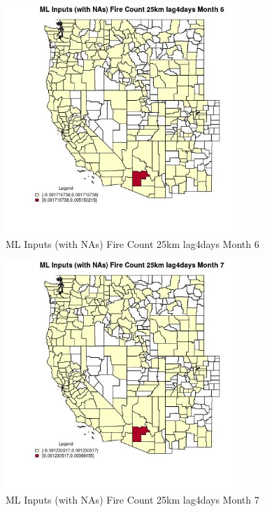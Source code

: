 \begin{figure} 
\centering  
\includegraphics[width=0.77\textwidth]{Code_Outputs/Report_ML_input_PM25_Step4_part_e_de_duplicated_aves_compiled_2019-05-21wNAs_CountyFire_Count_25km_lag4daysmedianMonth6.jpg} 
\caption{\label{fig:Report_ML_input_PM25_Step4_part_e_de_duplicated_aves_compiled_2019-05-21wNAsCountyFire_Count_25km_lag4daysmedianMonth6}ML Inputs (with NAs) Fire Count 25km lag4days Month 6} 
\end{figure} 
 

\begin{figure} 
\centering  
\includegraphics[width=0.77\textwidth]{Code_Outputs/Report_ML_input_PM25_Step4_part_e_de_duplicated_aves_compiled_2019-05-21wNAs_CountyFire_Count_25km_lag4daysmedianMonth7.jpg} 
\caption{\label{fig:Report_ML_input_PM25_Step4_part_e_de_duplicated_aves_compiled_2019-05-21wNAsCountyFire_Count_25km_lag4daysmedianMonth7}ML Inputs (with NAs) Fire Count 25km lag4days Month 7} 
\end{figure} 
 

